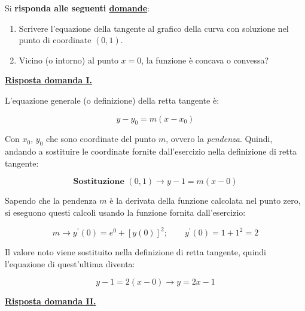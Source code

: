 \documentclass[a4paper]{article}
\begin{document}
	\noindent
	Si \textbf{risponda alle seguenti \underline{domande}}:
	
	\begin{enumerate}[label=\Roman*.]
		\item Scrivere l'equazione della tangente al grafico della curva con soluzione nel punto di coordinate $\left(0, 1\right)$.
		
		\item Vicino (o intorno) al punto $x = 0$, la funzione è concava o convessa?
	\end{enumerate}
	
	\noindent
	\textcolor{Green4}{\textbf{\underline{Risposta domanda I.}}}\newline
	
	\noindent
	L'equazione generale (o definizione) della retta tangente è:
	
	\begin{equation*}
		y - y_{0} = m \left(x - x_{0}\right)
	\end{equation*}

	\noindent
	Con $x_{0}$, $y_{0}$ che sono coordinate del punto $m$, ovvero la \emph{pendenza}. Quindi, andando a sostituire le coordinate fornite dall'esercizio nella definizione di retta tangente:
	
	\begin{equation*}
		\textbf{Sostituzione } \left(0, 1\right) \rightarrow y - 1 = m \left(x - 0\right)
	\end{equation*}

	\noindent
	Sapendo che la pendenza $m$ è la derivata della funzione calcolata nel punto zero, si eseguono questi calcoli usando la funzione fornita dall'esercizio:
	
	\begin{equation*}
		m \longrightarrow y^{'}\left(0\right) = e^{0} + \left[y\left(0\right)\right]^{2}; \hspace{2em} y^{'}\left(0\right) = 1 + 1^{2} = 2
	\end{equation*}

	\noindent
	Il valore noto viene sostituito nella definizione di retta tangente, quindi l'equazione di quest'ultima diventa:
	
	\begin{equation*}
		y - 1 = 2\left(x - 0\right) \longrightarrow y = 2x - 1
	\end{equation*}\newline
	
	\noindent
	\textcolor{Green4}{\textbf{\underline{Risposta domanda II.}}}\newline
	
\end{document}
